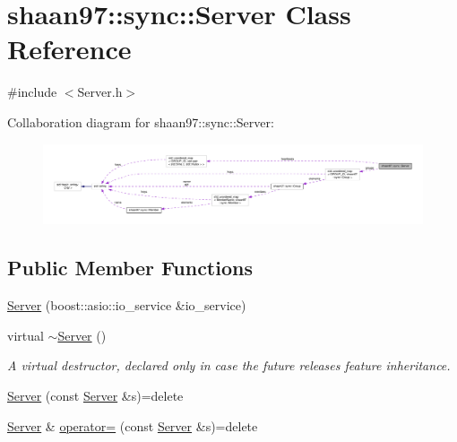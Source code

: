 \hypertarget{classshaan97_1_1sync_1_1_server}{}\section{shaan97\+:\+:sync\+:\+:Server Class Reference}
\label{classshaan97_1_1sync_1_1_server}


{\ttfamily \#include $<$Server.\+h$>$}



Collaboration diagram for shaan97\+:\+:sync\+:\+:Server\+:
\nopagebreak
\begin{figure}[H]
\begin{center}
\leavevmode
\includegraphics[width=350pt]{classshaan97_1_1sync_1_1_server__coll__graph}
\end{center}
\end{figure}
\subsection*{Public Member Functions}
\begin{DoxyCompactItemize}
\item 
\hyperlink{classshaan97_1_1sync_1_1_server_ac9ad7c8bb7fe2f5da5101da1297c9ae1}{Server} (boost\+::asio\+::io\+\_\+service \&io\+\_\+service)
\item 
virtual \hyperlink{classshaan97_1_1sync_1_1_server_a4b3aa2579cb1c8cd1d069582c14d0fa6}{$\sim$\+Server} ()
\begin{DoxyCompactList}\small\item\em A virtual destructor, declared only in case the future releases feature inheritance. \end{DoxyCompactList}\item 
\hyperlink{classshaan97_1_1sync_1_1_server_a8b4a5707430edcd54c02b940bc95bc30}{Server} (const \hyperlink{classshaan97_1_1sync_1_1_server}{Server} \&s)=delete
\item 
\hyperlink{classshaan97_1_1sync_1_1_server}{Server} \& \hyperlink{classshaan97_1_1sync_1_1_server_ae5e4a1ad89562429b73ab4c398d5d2fb}{operator=} (const \hyperlink{classshaan97_1_1sync_1_1_server}{Server} \&s)=delete
\end{DoxyCompactItemize}
